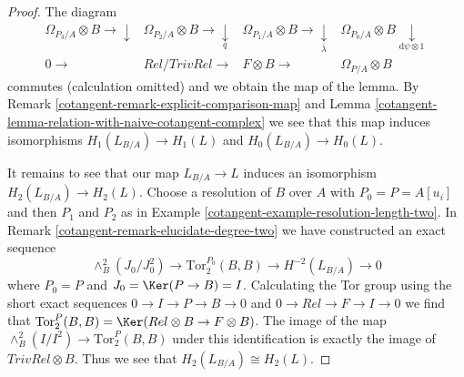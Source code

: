 \begin{proof}
\medskip\noindent
The diagram
$$
\begin{array}{cccc}\Omega_{P_3/A} \otimes B \longrightarrow\downarrow & \Omega_{P_2/A} \otimes B \longrightarrow\underset{q}{\downarrow} & \Omega_{P_1/A} \otimes B \longrightarrow\underset{\overline{\lambda}}{\downarrow} & \Omega_{P_0/A} \otimes B \underset{\text{d}\psi \otimes 1}{\downarrow} \\ 0 \longrightarrow & Rel/TrivRel \longrightarrow & F \otimes B \longrightarrow & \Omega_{P/A} \otimes B\end{array}
$$
commutes (calculation omitted) and we obtain the map of the lemma.
By Remark \ref{cotangent-remark-explicit-comparison-map} and
Lemma \ref{cotangent-lemma-relation-with-naive-cotangent-complex} we see that this map
induces isomorphisms $H_1(L_{B/A}) \to H_1(L)$ and $H_0(L_{B/A}) \to H_0(L)$.

\medskip\noindent
It remains to see that our map $L_{B/A} \to L$ induces an isomorphism
$H_2(L_{B/A}) \to H_2(L)$. Choose a resolution of $B$ over $A$ with
$P_0 = P = A[u_i]$ and then $P_1$ and $P_2$ as in
Example \ref{cotangent-example-resolution-length-two}.
In Remark \ref{cotangent-remark-elucidate-degree-two} we have constructed an exact
sequence
$$
\wedge^2_B(J_0/J_0^2) \to \text{Tor}_2^{P_0}(B, B) \to H^{-2}(L_{B/A}) \to 0
$$
where $P_0 = P$ and $J_0 = \Ker(P \to B) = I$.
Calculating the Tor group using the short exact sequences
$0 \to I \to P \to B \to 0$ and $0 \to Rel \to F \to I \to 0$
we find that
$\text{Tor}_2^P(B, B) = \Ker(Rel \otimes B \to F \otimes B)$.
The image of the map $\wedge^2_B(I/I^2) \to \text{Tor}_2^P(B, B)$
under this identification is exactly the image of $TrivRel \otimes B$.
Thus we see that $H_2(L_{B/A}) \cong H_2(L)$.


\end{proof}
